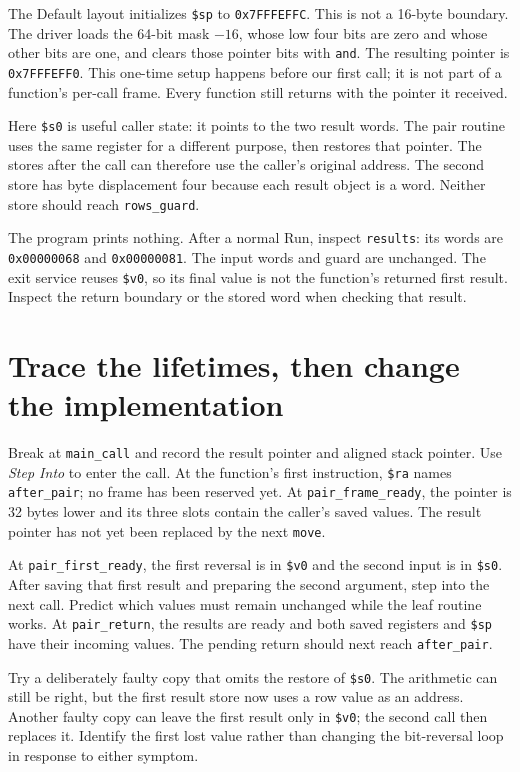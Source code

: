 The Default layout initializes \texttt{\$sp} to \texttt{0x7FFFEFFC}. This is not
a 16-byte boundary. The driver loads the 64-bit mask $-16$, whose low four bits
are zero and whose other bits are one, and clears those pointer bits with
\texttt{and}. The resulting pointer is \texttt{0x7FFFEFF0}. This one-time setup
happens before our first call; it is not part of a function's per-call frame.
Every function still returns with the pointer it received.

Here \texttt{\$s0} is useful caller state: it points to the two result words.
The pair routine uses the same register for a different purpose, then restores
that pointer. The stores after the call can therefore use the caller's original
address. The second store has byte displacement four because each result object
is a word. Neither store should reach \texttt{rows\_guard}.

The program prints nothing. After a normal Run, inspect \texttt{results}: its
words are \texttt{0x00000068} and \texttt{0x00000081}. The input words and guard
are unchanged. The exit service reuses \texttt{\$v0}, so its final value is not
the function's returned first result. Inspect the return boundary or the stored
word when checking that result.

\section{Trace the lifetimes, then change the implementation}

Break at \texttt{main\_call} and record the result pointer and aligned stack
pointer. Use \emph{Step Into} to enter the call. At the function's first
instruction, \texttt{\$ra} names \texttt{after\_pair}; no frame has been reserved
yet. At \texttt{pair\_frame\_ready}, the pointer is 32 bytes lower and its three
slots contain the caller's saved values. The result pointer has not yet been
replaced by the next \texttt{move}.

At \texttt{pair\_first\_ready}, the first reversal is in \texttt{\$v0} and the
second input is in \texttt{\$s0}. After saving that first result and preparing
the second argument, step into the next call. Predict which values must remain
unchanged while the leaf routine works. At \texttt{pair\_return}, the results
are ready and both saved registers and \texttt{\$sp} have their incoming values.
The pending return should next reach \texttt{after\_pair}.

Try a deliberately faulty copy that omits the restore of \texttt{\$s0}. The
arithmetic can still be right, but the first result store now uses a row value as
an address. Another faulty copy can leave the first result only in
\texttt{\$v0}; the second call then replaces it. Identify the first lost value
rather than changing the bit-reversal loop in response to either symptom.

